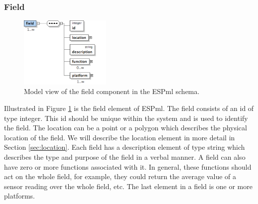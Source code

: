 \subsubsection{Field}
\begin{figure}[t]
  \begin{center}
    \includegraphics[width=0.39\textwidth]{images/field}
    \caption{Model view of the field component in the ESPml schema.}
    \label{fig:field}
  \end{center}
\end{figure}
Illustrated in Figure \ref{fig:field} is the field element of
ESPml. The field consists of an id of type integer. This id should be
unique within the system and is used to identify the field. The
location can be a point or a polygon which describes the physical
location of the field. We will describe the location element in more
detail in Section \ref{sec:location}. Each field has a description
element of type string which describes the type and purpose of the
field in a verbal manner. A field can also have zero or more functions
associated with it. In general, these functions should act on
the whole field, for example, they could return the average value of a
sensor reading over the whole field, etc. The last element in a field
is one or more platforms.


